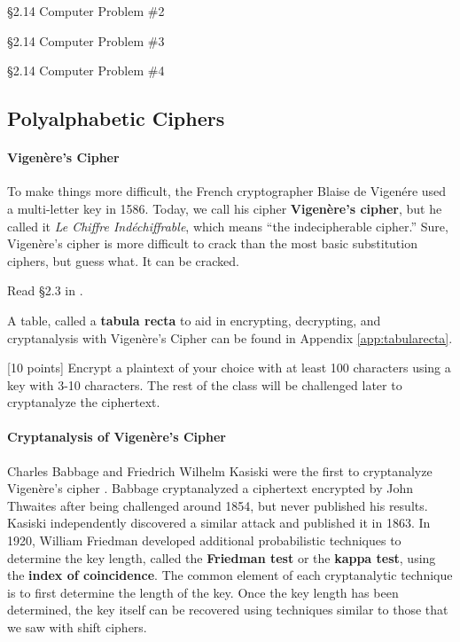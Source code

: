 \begin{problem} [10 points]
\S 2.14 Computer Problem \#2
\end{problem}

\begin{problem} [10 points]
\S 2.14 Computer Problem \#3
\end{problem}

\begin{problem} [10 points]
\S 2.14 Computer Problem \#4
\end{problem}



		\subsection{Polyalphabetic Ciphers}

			\paragraph*{Vigen\`{e}re's Cipher}
                        To make things more difficult, the French cryptographer Blaise de Vigen\'{e}re used a multi-letter key in 1586. Today, we call his cipher {\bf Vigen\`{e}re's cipher},  but he called it {\em Le Chiffre Ind\'echiffrable}, which means ``the indecipherable cipher.'' Sure, Vigen\`{e}re's cipher is more difficult to crack than the most basic substitution ciphers, but guess what. It can be cracked.

                        Read \S 2.3 in \cite{tw}.

A table, called a {\bf tabula recta} to aid in encrypting, decrypting, and cryptanalysis with Vigen\`ere's Cipher can be found in Appendix \ref{app:tabularecta}.

\begin{problem}
\label{prob-vig-enc} [10 points]
Encrypt a plaintext of your choice with at least 100 characters using a key with 3-10 characters. The rest of the class will be challenged later to cryptanalyze the ciphertext.
\end{problem}

	\paragraph*{Cryptanalysis of Vigen\`{e}re's Cipher}

                Charles Babbage  and Friedrich Wilhelm Kasiski  were the first to cryptanalyze Vigen\`{e}re's cipher  \cite{singh}. Babbage cryptanalyzed a ciphertext encrypted by John Thwaites after being challenged around 1854, but never published his results. Kasiski independently discovered a similar attack and published it in 1863. In 1920, William Friedman  developed additional probabilistic techniques to determine the key length, called the {\bf Friedman test} or the {\bf kappa test}, using the {\bf index of coincidence}. The common element of each cryptanalytic technique is to first determine the length of the key. Once the key length has been determined, the key itself can be recovered using techniques similar to those that we saw with shift ciphers.

